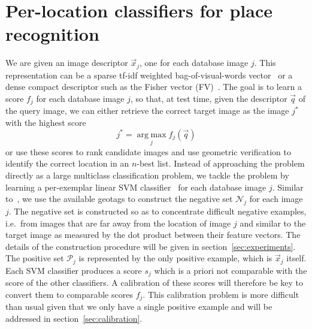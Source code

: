 \section{Per-location classifiers for place recognition}
\label{sec:classifiers}
   We are given an image descriptor $\vec{x}_j$, one for each database image $j$. This representation can be a sparse tf-idf weighted bag-of-visual-words vector~\cite{Sivic03} or a dense compact descriptor such as the Fisher vector (FV)~\cite{Jegou12}. The goal is to learn a score $f_j$ for each database image $j$, so that, at test time, given the descriptor $\vec{q}$ of the query image, we can either retrieve the correct target image as the image $j^*$ with the highest score
   \begin{equation}
   \label{eq:class}
    j^*=\operatorname*{arg\;max}_{j} f_j(\vec{q}) 
   \end{equation}
   \noindent
   or use these scores to rank candidate images and use geometric verification to identify the correct location in an $n$-best list.
   Instead of approaching the problem directly as a large multiclass classification problem, we tackle the problem by learning a per-exemplar linear SVM classifier~\cite{Malisiewicz11}  for each database image $j$.
   Similar to~\cite{Knopp2010}, we use the available geotags to construct the negative set $\mathcal N_j$ for each image $j$. The negative set is constructed so as to concentrate difficult negative examples, i.e.\ from images that are far away from the location of image $j$ and
   similar to the target image as measured by the dot product between their feature vectors. The details of the construction procedure will be given in section~\ref{sec:experiments}.  The positive set $\mathcal P_j$ is represented by the only positive example, which is $\vec{x}_j$ itself. 
   Each SVM classifier produces a score $s_j$ which is a priori not comparable with the score of the other classifiers. A calibration of these scores will therefore be key to convert them to comparable scores $f_j$. This calibration problem is more difficult than usual given that we only have a single positive example and will be addressed in section~\ref{sec:calibration}.
   
